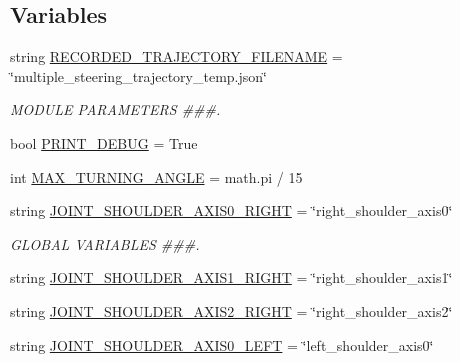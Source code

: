 \subsection*{Variables}
\begin{DoxyCompactItemize}
\item 
string \mbox{\hyperlink{namespacesteering__interpolate__multiple__trajectories__and__print_abff55433943d763524cabcc9e147f79d}{R\+E\+C\+O\+R\+D\+E\+D\+\_\+\+T\+R\+A\+J\+E\+C\+T\+O\+R\+Y\+\_\+\+F\+I\+L\+E\+N\+A\+ME}} = \char`\"{}multiple\+\_\+steering\+\_\+trajectory\+\_\+temp.\+json\char`\"{}
\begin{DoxyCompactList}\small\item\em M\+O\+D\+U\+LE P\+A\+R\+A\+M\+E\+T\+E\+RS \#\#\#. \end{DoxyCompactList}\item 
bool \mbox{\hyperlink{namespacesteering__interpolate__multiple__trajectories__and__print_a4fdac325563923bb16fc60ef13e23985}{P\+R\+I\+N\+T\+\_\+\+D\+E\+B\+UG}} = True
\item 
int \mbox{\hyperlink{namespacesteering__interpolate__multiple__trajectories__and__print_abe63139c1d174a200b75814ba1148bb5}{M\+A\+X\+\_\+\+T\+U\+R\+N\+I\+N\+G\+\_\+\+A\+N\+G\+LE}} = math.\+pi / 15
\item 
string \mbox{\hyperlink{namespacesteering__interpolate__multiple__trajectories__and__print_a02195a7a42f67f4af354227794662503}{J\+O\+I\+N\+T\+\_\+\+S\+H\+O\+U\+L\+D\+E\+R\+\_\+\+A\+X\+I\+S0\+\_\+\+R\+I\+G\+HT}} = \char`\"{}right\+\_\+shoulder\+\_\+axis0\char`\"{}
\begin{DoxyCompactList}\small\item\em G\+L\+O\+B\+AL V\+A\+R\+I\+A\+B\+L\+ES \#\#\#. \end{DoxyCompactList}\item 
string \mbox{\hyperlink{namespacesteering__interpolate__multiple__trajectories__and__print_ad1bcac7071ff58234b4c80fe6e57a571}{J\+O\+I\+N\+T\+\_\+\+S\+H\+O\+U\+L\+D\+E\+R\+\_\+\+A\+X\+I\+S1\+\_\+\+R\+I\+G\+HT}} = \char`\"{}right\+\_\+shoulder\+\_\+axis1\char`\"{}
\item 
string \mbox{\hyperlink{namespacesteering__interpolate__multiple__trajectories__and__print_aee43a630684af60ac0f5c7e7cb4f876a}{J\+O\+I\+N\+T\+\_\+\+S\+H\+O\+U\+L\+D\+E\+R\+\_\+\+A\+X\+I\+S2\+\_\+\+R\+I\+G\+HT}} = \char`\"{}right\+\_\+shoulder\+\_\+axis2\char`\"{}
\item 
string \mbox{\hyperlink{namespacesteering__interpolate__multiple__trajectories__and__print_ae49742ad3775a10bb2afe9a269b33f00}{J\+O\+I\+N\+T\+\_\+\+S\+H\+O\+U\+L\+D\+E\+R\+\_\+\+A\+X\+I\+S0\+\_\+\+L\+E\+FT}} = \char`\"{}left\+\_\+shoulder\+\_\+axis0\char`\"{}

\end{DoxyCompactItemize}
